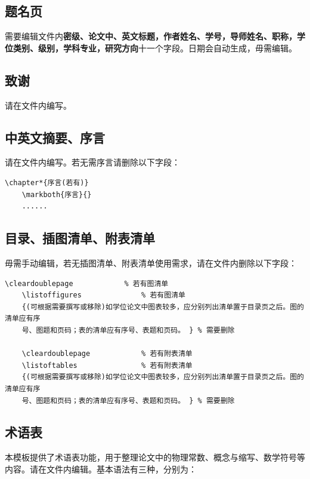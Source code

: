 \subsection{题名页}
需要编辑文件内\textbf{密级、论文中、英文标题，作者姓名、学号，导师姓名、职称，学位类别、级别，学科专业，研究方向}十一个字段。日期会自动生成，毋需编辑。

\subsection{致谢}
请在文件内编写。

\subsection{中英文摘要、序言}
请在文件内编写。若无需序言请删除以下字段：

\begin{lstlisting}[language={[LaTeX]TeX}]
    \chapter*{序言(若有)}
    \markboth{序言}{}
    ......
\end{lstlisting}

\subsection{目录、插图清单、附表清单}
毋需手动编辑，若无插图清单、附表清单使用需求，请在文件内删除以下字段：
\begin{lstlisting}[language={[LaTeX]TeX}]
    \cleardoublepage            % 若有图清单
    \listoffigures              % 若有图清单
    {(可根据需要撰写或移除)如学位论文中图表较多，应分别列出清单置于目录页之后。图的清单应有序
    号、图题和页码；表的清单应有序号、表题和页码。 } % 需要删除
    
    \cleardoublepage            % 若有附表清单
    \listoftables               % 若有附表清单
    {(可根据需要撰写或移除)如学位论文中图表较多，应分别列出清单置于目录页之后。图的清单应有序
    号、图题和页码；表的清单应有序号、表题和页码。 } % 需要删除
\end{lstlisting}

\subsection{术语表}
本模板提供了术语表功能，用于整理论文中的物理常数、概念与缩写、数学符号等内容。请在文件内编辑。基本语法有三种，分别为：

